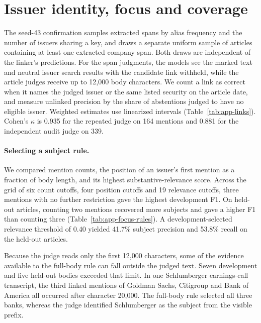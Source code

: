 \section{Issuer identity, focus and coverage}

The seed-43 confirmation samples extracted spans by alias frequency
and the number of issuers sharing a key, and draws a separate uniform
sample of articles containing at least one extracted company span.
Both draws are independent of the linker's predictions. For the span
judgments, the models see the marked text and neutral issuer search
results with the candidate link withheld, while the article judges
receive up to 12,000 body characters. We count a link as correct when
it names the judged issuer or the same listed security on the article
date, and measure unlinked precision by the share of abstentions judged
to have no eligible issuer. Weighted estimates use linearized intervals
(Table~\ref{tab:app-links}).
Cohen's $\kappa$ is 0.935 for the repeated judge on 164 mentions and
0.881 for the independent audit judge on 339.

\paragraph{Selecting a subject rule.}
We compared mention counts, the position of an issuer's first mention
as a fraction of body length, and its highest substantive-relevance
score. Across the grid of six count cutoffs, four position cutoffs and
19 relevance cutoffs, three mentions with no further restriction gave
the highest development F1. On held-out articles, counting two mentions
recovered more subjects and gave a higher F1 than counting three
(Table~\ref{tab:app-focus-rules}). A development-selected relevance
threshold of 0.40 yielded 41.7\% subject precision and 53.8\% recall
on the held-out articles.

Because the judge reads only the first 12,000 characters, some of the
evidence available to the full-body rule can fall outside the judged
text. Seven development and five held-out bodies exceeded that limit.
In one Schlumberger earnings-call
transcript, the third linked mentions of Goldman Sachs, Citigroup and
Bank of America all occurred after character 20,000. The full-body
rule selected all three banks, whereas the judge identified Schlumberger
as the subject from the visible prefix.

